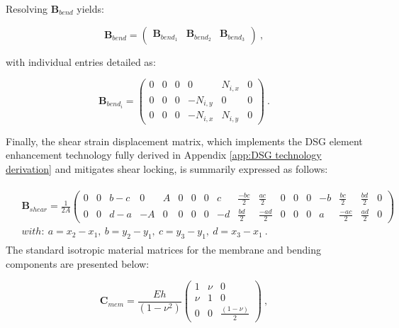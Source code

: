 Resolving $\mathbf{B}_{bend}$ yields:

\begin{equation} 
\mathbf{B}_{bend} =  \begin{pmatrix}
\mathbf{B}_{bend_1} & \mathbf{B}_{bend_2} & \mathbf{B}_{bend_3}
\end{pmatrix} 
\label{eqt8}\ ,
\end{equation}

with individual entries detailed as:

\begin{equation} 
\mathbf{B}_{bend_i} =  \begin{pmatrix}
0 & 0 & 0 & 0 & N_{i,x} & 0 \\
0 & 0 & 0 & -N_{i,y} & 0 & 0 \\
0 & 0 & 0 & -N_{i,x} & N_{i,y} & 0
\end{pmatrix} 
\label{eqt9}\ .
\end{equation}

Finally, the shear strain displacement matrix, which implements the DSG element enhancement technology fully derived in Appendix \ref{app:DSG technology derivation} and mitigates shear locking, is summarily expressed as follows:

\begin{gather} 
	\begin{aligned}
		& \mathbf{B}_{shear} =  \frac{1}{2 A}
		\begin{pmatrix}
			0 & 0 & b-c & 0 & A & 0 & 0 & 0 & c & \frac{-bc}{2} & \frac{ac}{2} & 0 & 0 & 0 & -b & \frac{bc}{2} & \frac{bd}{2} & 0 \\
			0 & 0 & d-a & -A & 0 & 0 & 0 & 0 & -d & \frac{bd}{2} & \frac{-ad}{2} & 0 & 0 & 0 & a & \frac{-ac}{2} & \frac{ad}{2} & 0
		\end{pmatrix}
		\\
		& with:\ 
		a = x_2-x_1,\ 
		b = y_2-y_1,\ 
		c = y_3-y_1,\ 
		d = x_3 - x_1
		\label{eqt10}\ .
	\end{aligned}
\end{gather}
The standard isotropic material matrices for the membrane and bending components are presented below:

\begin{equation} 
\mathbf{C}_{mem} =  \frac{Eh}{(1-\nu^2)}
\begin{pmatrix}
1 & \nu & 0 \\
\nu & 1 & 0 \\
0 & 0 & \frac{(1-\nu)}{2}
\end{pmatrix}
\label{eqt11}\ ,
\end{equation}

